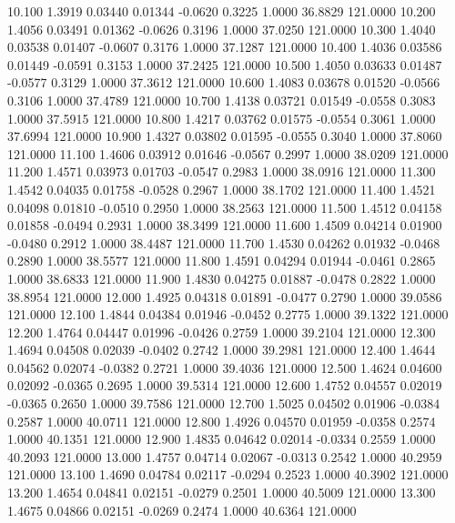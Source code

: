   10.100   1.3919   0.03440   0.01344  -0.0620   0.3225   1.0000  36.8829 121.0000
  10.200   1.4056   0.03491   0.01362  -0.0626   0.3196   1.0000  37.0250 121.0000
  10.300   1.4040   0.03538   0.01407  -0.0607   0.3176   1.0000  37.1287 121.0000
  10.400   1.4036   0.03586   0.01449  -0.0591   0.3153   1.0000  37.2425 121.0000
  10.500   1.4050   0.03633   0.01487  -0.0577   0.3129   1.0000  37.3612 121.0000
  10.600   1.4083   0.03678   0.01520  -0.0566   0.3106   1.0000  37.4789 121.0000
  10.700   1.4138   0.03721   0.01549  -0.0558   0.3083   1.0000  37.5915 121.0000
  10.800   1.4217   0.03762   0.01575  -0.0554   0.3061   1.0000  37.6994 121.0000
  10.900   1.4327   0.03802   0.01595  -0.0555   0.3040   1.0000  37.8060 121.0000
  11.100   1.4606   0.03912   0.01646  -0.0567   0.2997   1.0000  38.0209 121.0000
  11.200   1.4571   0.03973   0.01703  -0.0547   0.2983   1.0000  38.0916 121.0000
  11.300   1.4542   0.04035   0.01758  -0.0528   0.2967   1.0000  38.1702 121.0000
  11.400   1.4521   0.04098   0.01810  -0.0510   0.2950   1.0000  38.2563 121.0000
  11.500   1.4512   0.04158   0.01858  -0.0494   0.2931   1.0000  38.3499 121.0000
  11.600   1.4509   0.04214   0.01900  -0.0480   0.2912   1.0000  38.4487 121.0000
  11.700   1.4530   0.04262   0.01932  -0.0468   0.2890   1.0000  38.5577 121.0000
  11.800   1.4591   0.04294   0.01944  -0.0461   0.2865   1.0000  38.6833 121.0000
  11.900   1.4830   0.04275   0.01887  -0.0478   0.2822   1.0000  38.8954 121.0000
  12.000   1.4925   0.04318   0.01891  -0.0477   0.2790   1.0000  39.0586 121.0000
  12.100   1.4844   0.04384   0.01946  -0.0452   0.2775   1.0000  39.1322 121.0000
  12.200   1.4764   0.04447   0.01996  -0.0426   0.2759   1.0000  39.2104 121.0000
  12.300   1.4694   0.04508   0.02039  -0.0402   0.2742   1.0000  39.2981 121.0000
  12.400   1.4644   0.04562   0.02074  -0.0382   0.2721   1.0000  39.4036 121.0000
  12.500   1.4624   0.04600   0.02092  -0.0365   0.2695   1.0000  39.5314 121.0000
  12.600   1.4752   0.04557   0.02019  -0.0365   0.2650   1.0000  39.7586 121.0000
  12.700   1.5025   0.04502   0.01906  -0.0384   0.2587   1.0000  40.0711 121.0000
  12.800   1.4926   0.04570   0.01959  -0.0358   0.2574   1.0000  40.1351 121.0000
  12.900   1.4835   0.04642   0.02014  -0.0334   0.2559   1.0000  40.2093 121.0000
  13.000   1.4757   0.04714   0.02067  -0.0313   0.2542   1.0000  40.2959 121.0000
  13.100   1.4690   0.04784   0.02117  -0.0294   0.2523   1.0000  40.3902 121.0000
  13.200   1.4654   0.04841   0.02151  -0.0279   0.2501   1.0000  40.5009 121.0000
  13.300   1.4675   0.04866   0.02151  -0.0269   0.2474   1.0000  40.6364 121.0000
